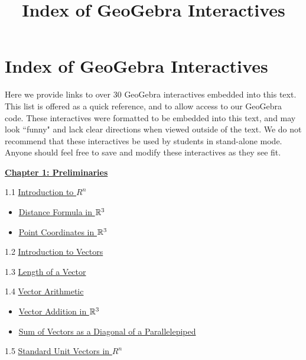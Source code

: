 \documentclass{ximera}
\title{Index of GeoGebra Interactives} \license{CC BY-NC-SA 4.0}
\begin{document}
\begin{abstract}
\end{abstract}
\maketitle
	
\section*{Index of GeoGebra Interactives}
Here we provide links to over 30 GeoGebra interactives embedded into this text.  This list is offered as a quick reference, and to allow access to our GeoGebra code. These interactives were formatted to be embedded into this text, and may look ``funny" and lack clear directions when viewed outside of the text. We do not recommend that these interactives be used by students in stand-alone mode.  Anyone should feel free to save and modify these interactives as they see fit.


\href{https://ximera.osu.edu/oerlinalg/LinearAlgebra/XLAChapter_prelim/main}{\textbf{Chapter 1: Preliminaries}}
	
1.1	\href{https://ximera.osu.edu/oerlinalg/LinearAlgebra/RRN-0010/main}{Introduction to $R^n$}
\begin{itemize}
\item
\href{https://www.geogebra.org/m/dc267r6v}{Distance Formula in $\mathbb{R}^3$}
\item
\href{https://www.geogebra.org/m/bynu3r84}{Point Coordinates in $\mathbb{R}^3$}
\end{itemize}
	
1.2	\href{https://ximera.osu.edu/oerlinalg/LinearAlgebra/VEC-0010/main}{Introduction to Vectors}
	
1.3	\href{https://ximera.osu.edu/oerlinalg/LinearAlgebra/VEC-0020/main}{Length of a Vector}
	
1.4	\href{https://ximera.osu.edu/oerlinalg/LinearAlgebra/VEC-0030/main}{Vector Arithmetic}

\begin{itemize}
    \item 
    \href{https://www.geogebra.org/m/ccpev33m}{Vector Addition in $\mathbb{R}^3$}
    \item
    \href{https://www.geogebra.org/m/bpzfb7vr}{Sum of Vectors as a Diagonal of a Parallelepiped}
\end{itemize}
	
1.5	\href{https://ximera.osu.edu/oerlinalg/LinearAlgebra/VEC-0035/main}{Standard Unit Vectors in $R^n$}
\end{document}

